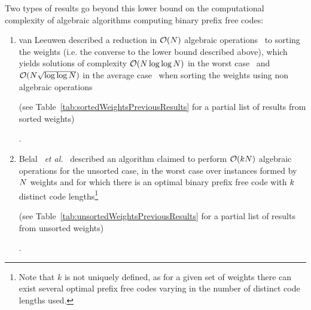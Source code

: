 \documentclass{llncs}
\providecommand{\etal}{~\emph{et al.}}
\providecommand{\Oh}{\ensuremath{{\cal O}}}
\providecommand{\nbWeights}{{\ensuremath N}}
\providecommand{\nbCodeLengths}{{\ensuremath k}}
\begin{document}
\pagebreak[3]
Two types of results go beyond this lower bound on the computational complexity of algebraic algorithms computing binary prefix free codes:
\begin{enumerate}
\item van Leeuwen described a reduction in $\Oh(\nbWeights)$ algebraic operations~\cite{1976-ICALP-OnTheConstructionOfHuffmanTrees-Leeuwen} to sorting the weights (i.e. the converse to the lower bound described above),
which yields solutions of complexity $\Oh(\nbWeights\log\log\nbWeights)$ in the worst case~\cite{2002-STOC-DeterministicSortingInOnlglgnTimeAndLinearSpace-Han,2004-JoA-DeterministicSortingInONLgLgNTimeAndLinearSpace-Han} and $\Oh(\nbWeights\sqrt{\log\log\nbWeights})$ in the average case~\cite{2012-FOCS-IntegerSrtingInNSqrtLgLgNExpectedTimeAndLinearSpace-HanThorup} when sorting the weights using non algebraic operations\begin{LONG} (see Table~\ref{tab:sortedWeightsPreviousResults} for a partial list of results from sorted weights)\end{LONG}.
\item %
Belal \etal~\cite{2006-STACS-DistributionSensitiveConstructionOfMinimumRedundancyPrefixCodes-BelalElmasry} described an algorithm claimed to perform $\Oh(\nbCodeLengths\nbWeights)$ algebraic operations for the unsorted case, in the worst case over instances formed by $\nbWeights$ weights and for which there is an optimal binary prefix free code with $\nbCodeLengths$ distinct code lengths\footnote{Note that $k$ is not uniquely defined, as for a given set of weights there can exist several optimal prefix free codes varying in the number of distinct code lengths used.}\begin{LONG} (see Table~\ref{tab:unsortedWeightsPreviousResults} for a partial list of results from unsorted weights)\end{LONG}.
\end{enumerate}
%
\end{document}
